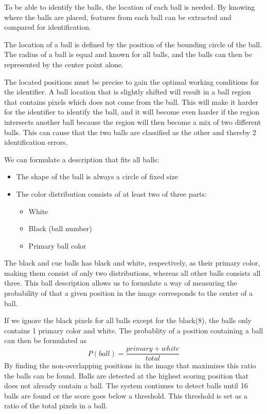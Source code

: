 To be able to identify the balls, the location of each ball is needed. By knowing where the balls are placed, features from each ball can be extracted and compared for identification.

The location of a ball is defined by the position of the bounding circle of the ball. The radius of a ball is equal  and known for all balls, and the balls can then be represented by the center point alone.

The located positions must be precise to gain the optimal working conditions for the identifier. A ball location that is slightly shifted will result in a ball region that contains pixels which does not come from the ball. This will make it harder for the identifier to identify the ball, and it will become even harder if the region intersects another ball because the region will then become a mix of two different balls. This can cause that the two balls are classified as the other and thereby 2 identification errors.

We can formulate a description that fits all balls:
\begin{itemize}
\item The shape of the ball is always a circle of fixed size
\item The color distribution consists of at least two of three parts:
	\begin{itemize}
		\item White
		\item Black (ball number)
		\item Primary ball color
	\end{itemize}
\end{itemize}
The black and cue balls has black and white, respectively, as their primary color, making them consist of only two distributions, whereas all other balls consists all three. This ball description allows us to formulate a way of measuring the probability of that a given position in the image corresponds to the center of a ball.

If we ignore the black pixels for all balls except for the black(8), the balls only contains 1 primary color and white. The probablity of a position containing a ball can then be formulated as
\begin{equation}
P(ball) = \frac{primary + white}{total}
\end{equation}
By finding the non-overlapping positions in the image that maximizes this ratio the balls can be found. Balls are detected at the highest scoring position that does not already contain a ball. The system continues to detect balls until 16 balls are found or the score goes below a threshold. This threshold is set as a ratio of the total pixels in a ball.

